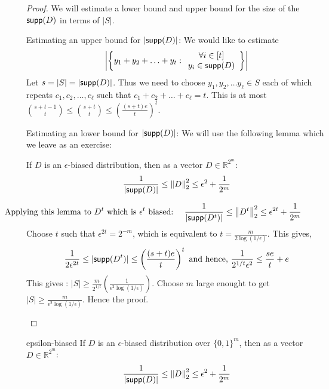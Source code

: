 \begin{proof}
\noindent We will estimate a lower bound and upper bound for the size of the ${\mathsf{supp}}(D)$ in terms of $|S|$.
\begin{description}
\item{\sf Estimating an upper bound for $|{\mathsf{supp}}(D)|$}:
We would like to estimate 
$$\left|\left\{ y_1+y_2+\ldots+y_t :
\begin{array}{c}
\forall i \in [t]\\ 
y_i \in {\mathsf{supp}}(D) 
\end{array}
\right\} \right|$$
Let $s = |S| = |{\mathsf{supp}}(D)|$. Thus we need to choose $y_1, y_2, \ldots y_\ell \in S$ each of which repeats $c_1, c_2, \ldots, c_\ell$ such that $c_1+c_2+\ldots+c_\ell = t$. This is at most ${s+t-1 \choose t} \le {s+t \choose t} \le \left(\frac{(s+t)e}{t}\right)^t$.
\item{\sf Estimating an lower bound for $|{\mathsf{supp}}(D)|$}:
We will use the following lemma which we leave as an exercise:
\begin{lemma}
If $D$ is an $\epsilon$-biased distribution, then as a vector $D \in \mathbb{R}^{2^m}$:
$$ \frac{1}{|{\mathsf{supp}}(D)|} \le {\left\lVert D\right\rVert}_2^2 \le \epsilon^2+\frac{1}{2^m}$$
\end{lemma}
\vspace{-5mm}
$$\hspace{-21mm}\textrm{ Applying this lemma to $D^t$ which is $\epsilon^t$ biased:~~~~}
\frac{1}{|\supp(D^t)|} \le \norm{D^t}^2 \le \epsilon^{2t}+\frac{1}{2^m}$$
Choose $t$ such that $\epsilon^{2t} = 2^{-m}$, which is equivalent to $t = \frac{m}{2\log(1/\epsilon)}$.
This gives, 
$$\frac{1}{2\epsilon^{2t}} \le |{\mathsf{supp}}(D^t)| \le \left(\frac{(s+t)e}{t}\right)^t \textrm{ and hence, }
\frac{1}{2^{1/t}\epsilon^{2}} \le \frac{se}{t}+e$$
This gives : $|S| \ge \frac{m}{2^{1/t}}\left(\frac{1}{\epsilon^2 \log(1/\epsilon)}\right)$. Choose $m$ large enought to get $|S| \ge \frac{m}{\epsilon^2 \log(1/\epsilon)}$. Hence the proof.
\end{description}
\end{proof}

\begin{exercise-prob}
\begin{show-ps4}{epsilon-biased}
If $D$ is an $\epsilon$-biased distribution over $\{0,1\}^m$, then as a vector $D \in \mathbb{R}^{2^m}$:
$$ \frac{1}{|{\mathsf{supp}}(D)|} \le {\left\lVert D\right\rVert}_2^2 \le \epsilon^2+\frac{1}{2^m}$$
\end{show-ps4}
\end{exercise-prob}


